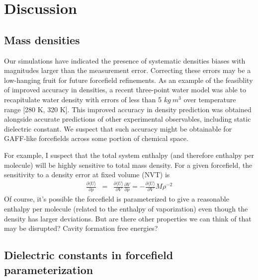 \documentclass[aps,pre,twocolumn,nofootinbib,superscriptaddress,linenumbers]{revtex4-1}
\begin{document}

\section{Discussion}

\subsection{Mass densities}

Our simulations have indicated the presence of systematic densities biases with magnitudes larger than the measurement error.  
Correcting these errors may be a low-hanging fruit for future forcefield refinements.
As an example of the feasiblity of improved accuracy in densities, a recent three-point water model was able to recapitulate water density with errors of less than 5 $kg \ m^3$ over temperature range [280 K, 320 K].
This improved accuracy in density prediction was obtained alongside accurate predictions of other experimental observables, including static dielectric constant.  
We suspect that such accuracy might be obtainable for GAFF-like forcefields across some portion of chemical space.  

\color{red}
For example, I suspect that the total system enthalpy (and therefore enthalpy per molecule) will be highly sensitive to total mass density.
For a given forcefield, the sensitivity to a density error at fixed volume (NVT) is 
\begin{eqnarray}
\frac{\partial \langle U \rangle}{\partial \rho} &=& \frac{\partial \langle U \rangle}{\partial V} \frac{\partial V}{\partial \rho} = - \frac{\partial \langle U \rangle}{\partial V} M \rho^{-2} 
\end{eqnarray}
Of course, it's possible the forcefield is parameterized to give a reasonable enthalpy per molecule (related to the enthalpy of vaporization) even though the density has larger deviations.
But are there other properties we can think of that may be disrupted?
Cavity formation free energies?
\color{black}


\subsection{Dielectric constants in forcefield parameterization}
\end{document}
